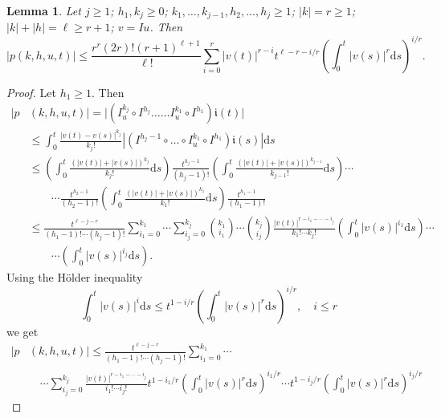 \documentclass{article}
\newtheorem{lemma}{Lemma}[section]
\newcommand{\dd}{\mathrm{d}}
\begin{document}
\begin{lemma}
	Let $j \geq 1$; $h_1, k_j \geq 0$; $k_1, \ldots, k_{j-1}, h_2, \ldots, h_j \geq 1$; $|k|=r \geq 1$; $|k|+|h|=\ell \geq r+1$; $v=I u$. Then
	\begin{equation}
		\label{eq:10}
		|p(k, h, u, t)| \leq \frac{r^r (2 r)! (r+1)^{\ell+1}}{\ell !} \sum_{i=0}^r|v(t)|^{r-i} t^{\ell-r-i / r}\left(\int_0^t|v(s)|^r \dd s\right)^{i / r} .
	\end{equation}
\end{lemma}

\begin{proof}
	Let $h_1 \geq 1$. 
	Then 
	\begin{equation*}
		\begin{split}
			|p &(k, h, u, t)| = |(I_u^{k_j} \circ I^{h_j} \ldots \ldots I_u^{k_1} \circ I^{h_1}) \mathfrak{i}(t)| \\
			& \leq \int_0^t \frac{|v(t)-v(s)|^{k_j}}{k_{j} !} |(I^{h_j-1} \circ \ldots \circ I_u^{k_1} \circ I^{h_1}) \mathfrak{i}(s)| \dd s \\
			& \leq \left(\int_0^t \frac{(|v(t)|+|v(s)|)^{k_j}}{k_j!} \dd s \right) \frac{t^{h_j-1}}{(h_j-1)!} \left(\int_0^t \frac{(|v(t)|+|v(s)|)^{k_{j-1}}}{k_{j-1}!} \dd s \right) \dotsb \\
			& \quad \quad \dotsb \frac{t^{h_2-1}}{(h_2-1)!} \left(\int_0^t \frac{(|v(t)|+|v(s)|)^{k_1}}{k_1!} \dd s \right)\frac{t^{h_1-1}}{(h_1-1)!} \\
			& \leq \frac{t^{\ell-j-r}}{(h_1-1)!\dotsb(h_j-1)!} \sum_{i_1=0}^{k_1} \dotsb \sum_{i_j=0}^{k_j} \binom{k_1}{i_1} \dotsb \binom{k_j}{i_j} \frac{|v(t)|^{r-i_1-\dotsb-i_j}}{k_1!\dotsb k_j!} \left(\int_0^t |v(s)|^{i_1} \dd s\right) \dotsb \\
			& \quad \quad \dotsb \left(\int_0^t |v(s)|^{i_j} \dd s\right).
		\end{split}
	\end{equation*}
	Using the Hölder inequality
	\begin{equation}
		\label{eq:11}
		\int_0^t |v(s)|^i \dd s \leq t^{1-i/r} \left( \int_0^t |v(s)|^r \dd s\right)^{i/r},\quad i \leq r
	\end{equation}
	we get
	\begin{equation*}
		\begin{split}
			|p&(k,h,u,t)| \leq \frac{t^{\ell-j-r}}{(h_1-1)! \dotsb (h_j-1)!} \sum_{i_1=0}^{k_1} \dotsb \\
			& \quad \dotsb \sum_{i_j=0}^{k_j} \frac{|v(t)|^{r-i_1-\dotsb-i_j}}{i_1!\dotsb i_j!} t^{1-i_1/r}
			\left(\int_0^t |v(s)|^r \dd s\right)^{i_1/r} \dotsb t^{1-i_j/r} \left(\int_0^t |v(s)|^r \dd s\right)^{i_j/r}

\end{split}
\end{equation*}
\end{proof}
\end{document}
